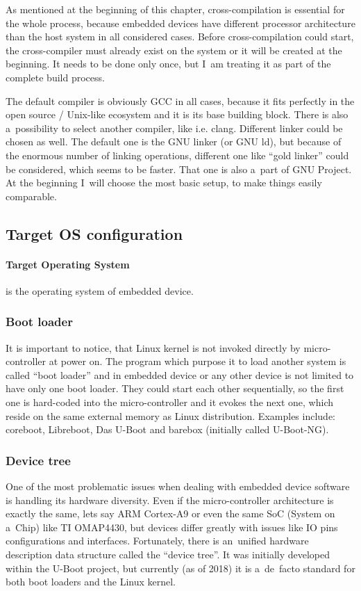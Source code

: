 \documentclass[printmode]{mgr}
\begin{document}
As mentioned at the beginning of this chapter, cross-compilation is essential for the whole process, because embedded devices have different processor architecture than the host system in all considered cases. Before cross-compilation could start, the cross-compiler must already exist on the system or it will be created at the beginning. It needs to be done only once, but I~am treating it as part of the complete build process.

The default compiler is obviously GCC in all cases, because it fits perfectly in the open source / Unix-like ecosystem and it is its base building block. There is also a~possibility to select another compiler, like i.e. clang. Different linker could be chosen as well. The default one is the GNU linker (or GNU ld), but because of the enormous number of linking operations, different one like ``gold linker'' could be considered, which seems to be faster. That one is also a~part of GNU Project. At the beginning I~will choose the most basic setup, to make things easily comparable. 


\subsection{Target OS configuration}

\paragraph{Target Operating System} is the operating system of embedded device.

\subsubsection{Boot loader}
It is important to notice, that Linux kernel is not invoked directly by micro-controller at power on. The program which purpose it to load another system is called ``boot loader'' and in embedded device or any other device is not limited to have only one boot loader. They could start each other sequentially, so the first one is hard-coded into the micro-controller and it evokes the next one, which reside on the same external memory as Linux distribution. Examples include: coreboot, Libreboot, Das U-Boot and barebox (initially called U-Boot-NG).

\subsubsection{Device tree}
One of the most problematic issues when dealing with embedded device software is handling its hardware diversity. Even if the micro-controller architecture is exactly the same, lets say ARM Cortex-A9 or even the same SoC (System on a~Chip) like TI OMAP4430, but devices differ greatly with issues like IO pins configurations and interfaces. Fortunately, there is an~unified hardware description data structure called the ``device tree''. It was initially developed within the U-Boot project, but currently (as of 2018) it is a~de~facto standard for both boot loaders and the Linux kernel.
\end{document}
